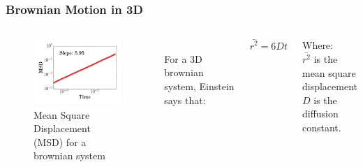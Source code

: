 \documentclass{beamer}
\begin{document}
  \begin{frame}
    \frametitle{Brownian Motion in 3D}
  	\begin{columns}[t] 
  	\begin{figure}[h]
  	  \includegraphics[width=2.5in]{brownianMSD.png}
      \caption{Mean Square Displacement (MSD) for a brownian system}
  	\end{figure}
      \vspace{0.25in}
      \\
      For a 3D brownian system, Einstein says that: \\
      \begin{centering}
        $\bar{r^2} = 6Dt$ \\
      \end{centering}
      Where:\\
      $\bar{r^2}$ is the mean square displacement \\
      $D$ is the diffusion constant.
    \end{columns}
    \vfill
  \end{frame}
\end{document}
